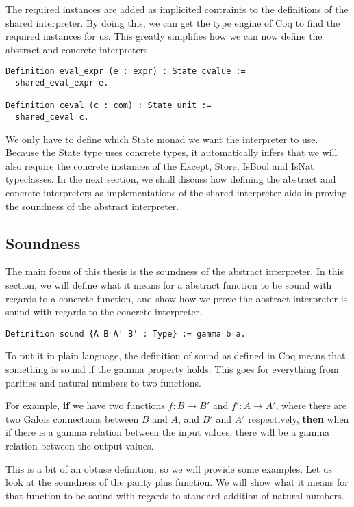 The required instances are added as implicited contraints to the definitions of
the shared interpreter. By doing this, we can get the type engine of Coq to
find the required instances for us. This greatly simplifies how we can now
define the abstract and concrete interpreters.

\begin{verbatim}
Definition eval_expr (e : expr) : State cvalue :=
  shared_eval_expr e.

Definition ceval (c : com) : State unit :=
  shared_ceval c.
\end{verbatim}

We only have to define which State monad we want the interpreter to use.
Because the State type uses concrete types, it automatically infers that we
will also require the concrete instances of the Except, Store, IsBool and IsNat
typeclasses. In the next section, we shall discuss how defining the abstract
and concrete interpreters as implementations of the shared interpreter aids in
proving the soundness of the abstract interpreter.

\subsection{Soundness}\label{sec:soundness}
The main focus of this thesis is the soundness of the abstract interpreter. In
this section, we will define what it means for a abstract function to be sound
with regards to a concrete function, and show how we prove the abstract 
interpreter is sound with regards to the concrete interpreter. 

\begin{verbatim}
Definition sound {A B A' B' : Type} := gamma b a.
\end{verbatim}

To put it in plain language, the definition of sound as defined in Coq means 
that something is sound if the gamma property holds. This goes for everything
from parities and natural numbers to two functions.

For example, \textbf{if} we have two functions $f : B \rightarrow B'$ and $f' 
: A \rightarrow A'$, where there are two Galois connections 
between $B$ and $A$, and $B'$ and $A'$ respectively, \textbf{then} when if 
there is a gamma relation between the input values, there will be a gamma
relation between the output values.

This is a bit of an obtuse definition, so we will provide some examples. Let us
look at the soundness of the parity plus function. We will show what it
means for that function to be sound with regards to standard addition of
natural numbers.

